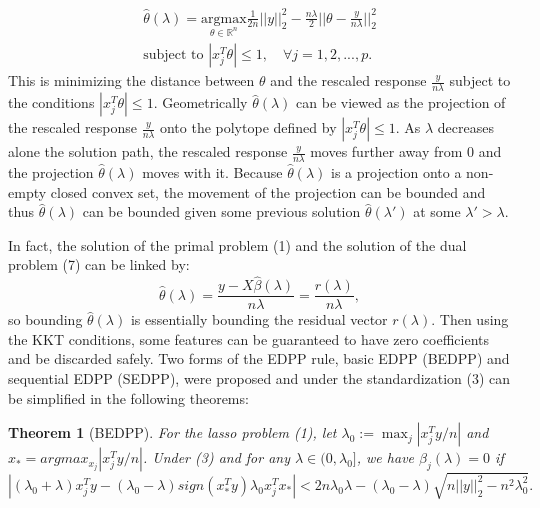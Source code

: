 \documentclass{article}
\newtheorem{theorem}{Theorem}[section]
\begin{document}
\begin{equation}
    \begin{split}
        \hat{\theta}(\lambda) = \underset{\theta\in \mathbb{R}^n}{\mathrm{argmax}}\frac{1}{2n}||y||_2^2-\frac{n\lambda}{2}||\theta-\frac{y}{n\lambda}||_2^2\\
        \textrm{subject to } |x_j^T\theta|\leq 1,\quad \forall j=1,2,...,p.
    \end{split}
\end{equation}
This is minimizing the distance between $\theta$ and the rescaled response $\frac{y}{n\lambda}$ subject to the conditions $|x_j^T\theta|\leq 1$. Geometrically $\hat{\theta}(\lambda)$ can be viewed as the projection of the rescaled response $\frac{y}{n\lambda}$ onto the polytope defined by $|x_j^T\theta|\leq 1$. As $\lambda$ decreases alone the solution path, the rescaled response $\frac{y}{n\lambda}$ moves further away from 0 and the projection $\hat{\theta}(\lambda)$ moves with it. Because $\hat{\theta}(\lambda)$ is a projection onto a non-empty closed convex set, the movement of the projection can be bounded and thus $\hat{\theta}(\lambda)$ can be bounded given some previous solution $\hat{\theta}(\lambda')$ at some $\lambda'>\lambda$.

In fact, the solution of the primal problem (1) and the solution of the dual problem (7) can be linked by:
\begin{equation}
    \hat{\theta}(\lambda)=\frac{y-X\hat{\beta}(\lambda)}{n\lambda}=\frac{r(\lambda)}{n\lambda},
\end{equation}
so bounding $\hat{\theta}(\lambda)$ is essentially bounding the residual vector $r(\lambda)$. Then using the KKT conditions, some features can be guaranteed to have zero coefficients and be discarded safely. Two forms of the EDPP rule, basic EDPP (BEDPP) and sequential EDPP (SEDPP)\cite{wang2013lasso}, were proposed and under the standardization (3) can be simplified in the following theorems\cite{zeng2017efficient}:

\begin{theorem}[BEDPP]
    For the lasso problem (1), let $\lambda_0:=\max_j|x_j^Ty/n|$ and $x_*=argmax_{x_j}|x_j^Ty/n|$. Under (3) and for any $\lambda\in(0,\lambda_0]$, we have $\hat{\beta}_j(\lambda)=0$ if
    \begin{equation}
        |(\lambda_0+\lambda)x_j^Ty-(\lambda_0-\lambda)sign(x_*^Ty)\lambda_0x_j^Tx_*|<2n\lambda_0\lambda-(\lambda_0-\lambda)\sqrt{n||y||_2^2-n^2\lambda_0^2}.
    \end{equation}
\end{theorem}
\end{document}
